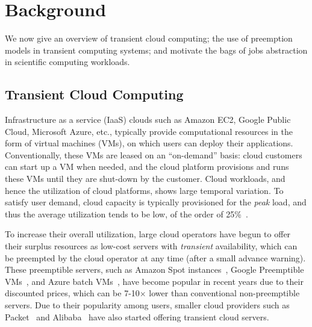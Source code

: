 \vspace*{\subsecspace}
\section{Background}

We now give an overview of transient cloud computing; the use of preemption models in transient computing systems; and motivate the bags of jobs abstraction in scientific computing workloads. 



\vspace*{\subsecspace}
\subsection{Transient Cloud Computing}

Infrastructure as a service (IaaS) clouds such as Amazon EC2, Google Public Cloud, Microsoft Azure, etc., typically provide computational resources in the form of virtual machines (VMs), on which users can deploy their applications.
Conventionally, these VMs are leased on an ``on-demand'' basis: cloud customers can start up a VM when needed, and the cloud platform provisions and runs these VMs until they are shut-down by the customer. 
Cloud workloads, and hence the utilization of cloud platforms, shows large temporal variation. 
To satisfy user demand, cloud capacity is typically provisioned for the \emph{peak} load, and thus the average utilization tends to be low, of the order of 25\%~\cite{borg,resource-central-sosp17}. 


To increase their overall utilization, large cloud operators have begun to offer their surplus resources as low-cost servers \footnotemark with \emph{transient} availability, which can be preempted by the cloud operator at any time (after a small advance warning). 
These preemptible servers, such as Amazon Spot instances~\cite{ec2-spot}, Google Preemptible VMs~\cite{preemptible-documentation}, and Azure batch VMs~\cite{azure-batch}, have become popular in recent years due to their discounted prices, which can be 7-10$\times$ lower than conventional non-preemptible servers.
%
Due to their popularity among users, smaller cloud providers such as Packet~\cite{packet-spot} and Alibaba~\cite{alibaba-spot} have also started offering transient cloud servers. 


